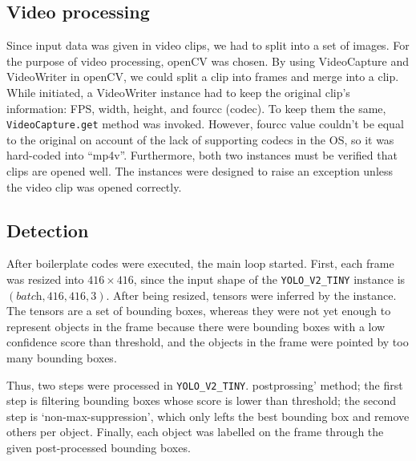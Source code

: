\documentclass[a4paper,12pt]{article}
\begin{document}
\subsection{Video processing}
Since input data was given in video clips, we had to split into a set of images. For the purpose of video processing, openCV was chosen. By using VideoCapture and VideoWriter in openCV, we could split a clip into frames and merge into a clip. While initiated, a VideoWriter instance had to keep the original clip’s information: FPS, width, height, and fourcc (codec). To keep them the same, \lstinline{VideoCapture.get} method was invoked. However, fourcc value couldn’t be equal to the original on account of the lack of supporting codecs in the OS, so it was hard-coded into “mp4v”.
Furthermore, both two instances must be verified that clips are opened well. The instances were designed to raise an exception unless the video clip was opened correctly.

\subsection{Detection}
After boilerplate codes were executed, the main loop started.
 First, each frame was resized into $416 \times 416$, since the input shape of the \lstinline{YOLO_V2_TINY} instance is $(\textit{batch}, 416, 416, 3)$.
 After being resized, tensors were inferred by the instance.
 The tensors are a set of bounding boxes, whereas they were not yet enough to represent objects in the frame because there were bounding boxes with a low confidence score than threshold, and the objects in the frame were pointed by too many bounding boxes.

Thus, two steps were processed in \lstinline{YOLO_V2_TINY}.
postprossing’ method; the first step is filtering bounding boxes whose score is lower than threshold; the second step is ‘non-max-suppression’, which only lefts the best bounding box and remove others per object.
Finally, each object was labelled on the frame through the given post-processed bounding boxes. 
\end{document}
